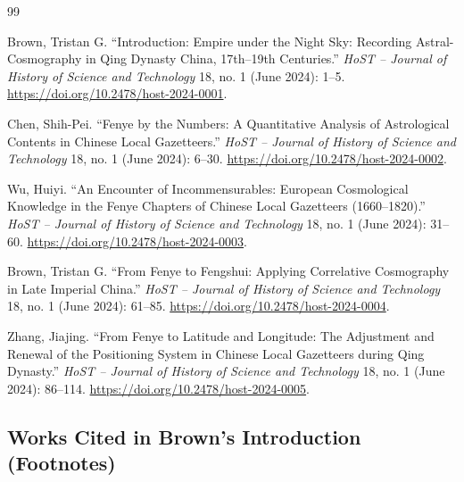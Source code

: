 \documentclass[12pt]{article}
\begin{document}
\begin{thebibliography}{99}
\setlength{\itemsep}{0.6em}

 Brown, Tristan G. ``Introduction: Empire under the Night Sky: Recording Astral-Cosmography in Qing Dynasty China, 17th--19th Centuries.'' \emph{HoST -- Journal of History of Science and Technology} 18, no. 1 (June 2024): 1--5. \url{https://doi.org/10.2478/host-2024-0001}.

 Chen, Shih-Pei. ``Fenye by the Numbers: A Quantitative Analysis of Astrological Contents in Chinese Local Gazetteers.'' \emph{HoST -- Journal of History of Science and Technology} 18, no. 1 (June 2024): 6--30. \url{https://doi.org/10.2478/host-2024-0002}.

 Wu, Huiyi. ``An Encounter of Incommensurables: European Cosmological Knowledge in the Fenye Chapters of Chinese Local Gazetteers (1660--1820).'' \emph{HoST -- Journal of History of Science and Technology} 18, no. 1 (June 2024): 31--60. \url{https://doi.org/10.2478/host-2024-0003}.

 Brown, Tristan G. ``From Fenye to Fengshui: Applying Correlative Cosmography in Late Imperial China.'' \emph{HoST -- Journal of History of Science and Technology} 18, no. 1 (June 2024): 61--85. \url{https://doi.org/10.2478/host-2024-0004}.

 Zhang, Jiajing. ``From Fenye to Latitude and Longitude: The Adjustment and Renewal of the Positioning System in Chinese Local Gazetteers during Qing Dynasty.'' \emph{HoST -- Journal of History of Science and Technology} 18, no. 1 (June 2024): 86--114. \url{https://doi.org/10.2478/host-2024-0005}.

\end{thebibliography}

\subsection*{Works Cited in Brown's Introduction (Footnotes)}
\end{document}

